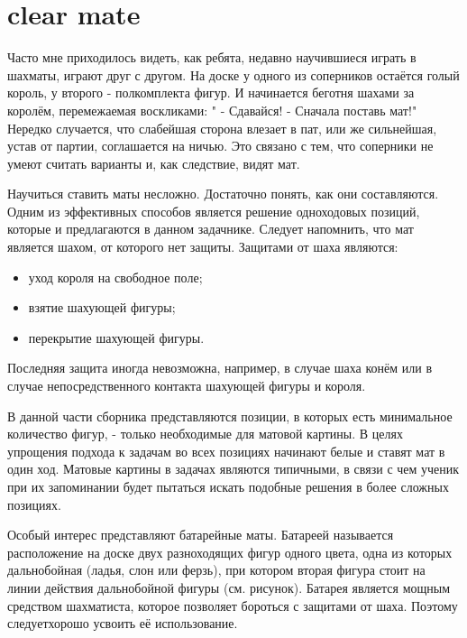 \section*{clear mate}


Часто мне приходилось видеть, как ребята, недавно научившиеся играть в шахматы, играют друг с другом. На доске у одного из соперников остаётся голый король, у второго - полкомплекта фигур. И начинается беготня шахами за королём, перемежаемая воскликами:  " - Сдавайся! - Сначала поставь мат!" Нередко случается, что слабейшая сторона влезает в пат, или же сильнейшая, устав от партии, соглашается на ничью. Это связано с тем, что соперники не умеют считать варианты и, как следствие, видят мат.

Научиться ставить маты несложно. Достаточно понять, как они составляются. Одним из эффективных способов является решение одноходовых позиций, которые и предлагаются в данном задачнике. Следует напомнить, что мат является шахом, от которого нет защиты. Защитами от шаха являются:

\begin{itemize}
\item{} уход короля на свободное поле;
\item{} взятие шахующей фигуры;
\item{} перекрытие шахующей фигуры.
\end{itemize}

Последняя защита иногда невозможна, например, в случае шаха конём или в случае непосредственного контакта шахующей фигуры и короля.

В данной части сборника представляются позиции, в которых есть минимальное количество фигур, - только необходимые для матовой картины. В целях упрощения подхода к задачам во всех позициях начинают белые и ставят мат в один ход. Матовые картины в задачах являются типичными, в связи с чем ученик при их запоминании будет пытаться искать подобные решения в более сложных позициях.


Особый интерес представляют батарейные маты. Батареей называется расположение на доске двух разноходящих фигур одного цвета, одна из которых дальнобойная (ладья, слон или ферзь), при котором вторая фигура стоит на линии действия дальнобойной фигуры (см. рисунок). Батарея является мощным средством шахматиста, которое позволяет бороться с защитами от шаха. Поэтому следуетхорошо усвоить её использование.